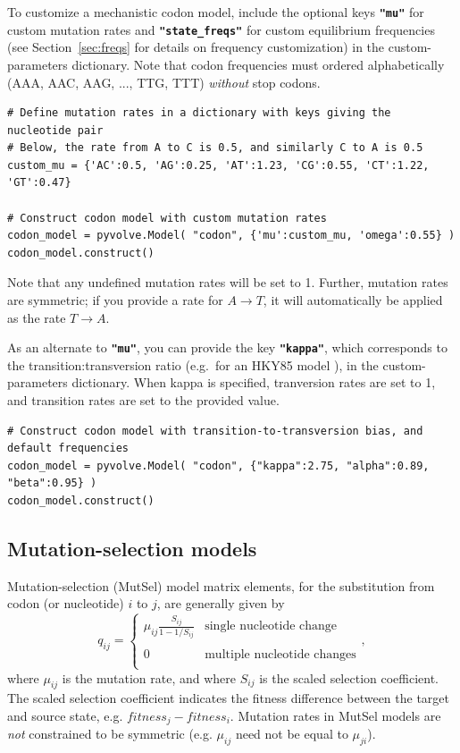 \documentclass{article}
\newcommand{\code}[1]{\textbf{\texttt{\small{#1}}}}
\begin{document}
To customize a mechanistic codon model, include the optional keys \code{"mu"} for custom mutation rates and \code{"state\_freqs"} for custom equilibrium frequencies (see Section~\ref{sec:freqs} for details on frequency customization) in the custom-parameters dictionary. Note that codon frequencies must ordered alphabetically (AAA, AAC, AAG, ..., TTG, TTT) \emph{without} stop codons.

\begin{lstlisting}
# Define mutation rates in a dictionary with keys giving the nucleotide pair
# Below, the rate from A to C is 0.5, and similarly C to A is 0.5
custom_mu = {'AC':0.5, 'AG':0.25, 'AT':1.23, 'CG':0.55, 'CT':1.22, 'GT':0.47} 

# Construct codon model with custom mutation rates
codon_model = pyvolve.Model( "codon", {'mu':custom_mu, 'omega':0.55} )
codon_model.construct()
\end{lstlisting}
Note that any undefined mutation rates will be set to 1. Further, mutation rates are symmetric; if you provide a rate for $A \rightarrow T$, it will automatically be applied as the rate $T \rightarrow A$. 

As an alternate to \code{"mu"}, you can provide the key \code{"kappa"}, which corresponds to the transition:transversion ratio (e.g.\ for an HKY85  model \citep{HKY85}), in the custom-parameters dictionary. When kappa is specified, tranversion rates are set to 1, and transition rates are set to the provided value.
\begin{lstlisting}
# Construct codon model with transition-to-transversion bias, and default frequencies
codon_model = pyvolve.Model( "codon", {"kappa":2.75, "alpha":0.89, "beta":0.95} )
codon_model.construct()
\end{lstlisting}




\subsection{Mutation-selection models}\label{sec:mutsel_basic}
Mutation-selection (MutSel) model \citep{HB98} matrix elements, for the substitution from codon (or nucleotide) $i$ to $j$, are generally given by 
\begin{equation}
q_{ij} = \left\{ 
\begin{array}{rl}
	\mu_{ij} \frac{S_{ij}}{1-1/S_{ij}} &\text{single nucleotide change} \\\\
	0                                  &\text{multiple nucleotide changes} \\             
\end{array} \right.,
\end{equation} where $\mu_{ij}$ is the mutation rate, and where $S_{ij}$ is the scaled selection coefficient. The scaled selection coefficient indicates the fitness difference between the target and source state, e.g. $fitness_j - fitness_i$. Mutation rates in MutSel models are \emph{not} constrained to be symmetric (e.g. $\mu_{ij}$ need not be equal to $\mu_{ji}$). 
\end{document}
